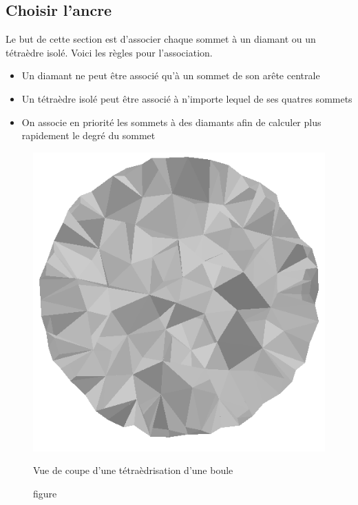 \documentclass[a4paper,11pt,openany]{article}
\begin{document}
\subsection{Choisir l'ancre}
\noindent
Le but de cette section est d'associer chaque sommet à un diamant ou un tétraèdre isolé. Voici les règles pour l'association.\\
\begin{itemize}
\item Un diamant ne peut être associé qu'à un sommet de son arête centrale
\item Un tétraèdre isolé peut être associé à n'importe lequel de ses quatres sommets
\item On associe en priorité les sommets à des diamants afin de calculer plus rapidement le degré du sommet
\end{itemize}
\begin{figure}[H]
\centering
\begin{minipage}{.5\textwidth}
  \centering
  \includegraphics[scale=0.2]{Images/half_ball}
  \caption{figure}{Vue de coupe d'une tétraèdrisation d'une boule}
  \label{fig:half_ball}
\end{minipage}%
\begin{minipage}{.5\textwidth}
  \centering

\end{minipage}
\end{figure}
\end{document}
